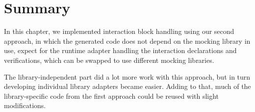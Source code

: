 \section{Summary}
In this chapter,
we implemented interaction block handling
using our second approach,
in which the generated code does not depend
on the mocking library in use,
expect for the runtime adapter
handling the interaction declarations and verifications,
which can be swapped to use different mocking libraries.

The library-independent part did a lot more work with this approach,
but in turn developing individual library adapters became easier.
Adding to that, much of the library-specific code from the first approach
could be reused with slight modifications.
